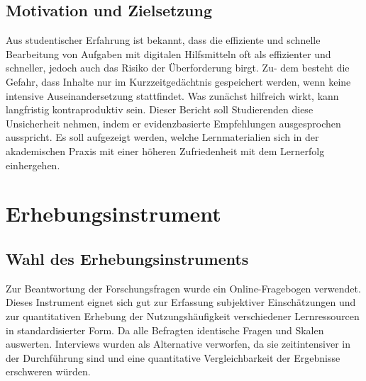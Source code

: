 \documentclass[a4paper, 12pt]{article}
\begin{document}
\subsection{Motivation und Zielsetzung}
Aus studentischer Erfahrung ist bekannt, dass die effiziente und schnelle Bearbeitung von Aufgaben mit digitalen Hilfsmitteln oft als effizienter und schneller, jedoch auch das Risiko der Überforderung birgt. Zu- dem besteht die Gefahr, dass Inhalte nur im Kurzzeitgedächtnis gespeichert werden, wenn keine intensive Auseinandersetzung stattfindet. Was zunächst hilfreich wirkt, kann langfristig kontraproduktiv sein. Dieser Bericht soll Studierenden diese Unsicherheit nehmen, indem er evidenzbasierte Empfehlungen ausgesprochen ausspricht. Es soll aufgezeigt werden, welche Lernmaterialien sich in der akademischen Praxis mit einer höheren Zufriedenheit mit dem Lernerfolg einhergehen.
\section{Erhebungsinstrument}

\subsection{Wahl des Erhebungsinstruments}
Zur Beantwortung der Forschungsfragen wurde ein Online-Fragebogen verwendet. Dieses Instrument eignet sich gut zur Erfassung subjektiver Einschätzungen und zur quantitativen Erhebung der Nutzungshäufigkeit verschiedener Lernressourcen in standardisierter Form. Da alle Befragten identische Fragen und Skalen auswerten. Interviews wurden als Alternative verworfen, da sie zeitintensiver in der Durchführung sind und eine quantitative Vergleichbarkeit
der Ergebnisse erschweren würden.
\end{document}
